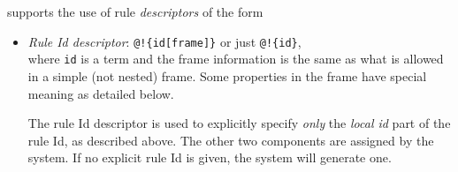 \documentclass[11pt]{article}
\newcommand{\ERGO}{\mbox{\smaller{\ensuremath{\cal{E}}\smaller{{\sc{RGO}}}}}\xspace}
\newcommand{\FLSYSTEM}{\ERGO}
\begin{document}
\noindent
\FLSYSTEM supports the use of rule \emph{descriptors} of the form
\begin{itemize}
\item  \emph{Rule Id descriptor}:   \texttt{@!\{id[frame]\}}  or just \texttt{@!\{id\}}, \\
  where \texttt{id} is a term and the frame information is the same as what
  is allowed in a simple (not nested) frame.
  Some properties in the frame have special meaning as detailed below.

  The rule Id descriptor is used to explicitly specify \emph{only}
  the \emph{local id}
  part of the rule Id, as described above. The other two components
  are assigned by the system. If no explicit rule Id is given, the system
  will generate one.


\end{itemize}
\end{document}
